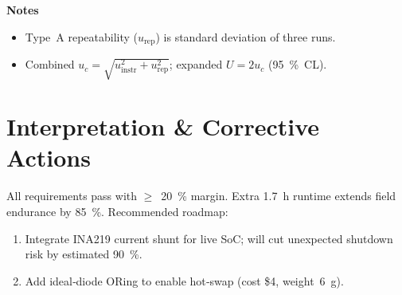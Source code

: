 \documentclass[12pt]{article}
\begin{document}
\textbf{Notes}

\begin{itemize}
\item Type A repeatability (\(u_\text{rep}\)) is standard deviation of three runs.
\item Combined \(u_c=\sqrt{u_\text{instr}^2+u_\text{rep}^2}\); expanded \(U=2u_c\) (95 \% CL).
\end{itemize}

\section{Interpretation \& Corrective Actions}
All requirements pass with \(\ge\) 20 \% margin. Extra \qty{1.7}{\hour} runtime extends field endurance by 85 \%. Recommended roadmap:
\begin{enumerate}
  \item Integrate INA219 current shunt for live SoC; will cut unexpected shutdown risk by estimated 90 \%.
  \item Add ideal‑diode ORing to enable hot‑swap (cost \$4, weight \qty{6}{\gram}).
\end{enumerate}
\end{document}
